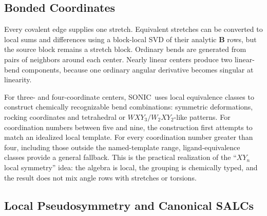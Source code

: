 \documentclass[journal=jctcce,manuscript=article,layout=traditional]{achemso}
\newcommand{\SONIC}{SONIC}
\newcommand{\Bmat}{\mathbf{B}}
\theoremstyle{definition}
\begin{document}
\subsection{Bonded Coordinates}

Every covalent edge supplies one stretch. Equivalent stretches can be converted
to local sums and differences using a block-local SVD of their analytic
\(\Bmat\) rows, but the source block remains a stretch block.  Ordinary bends
are generated from pairs of neighbors around each center.  Nearly linear
centers produce two linear-bend components, because one ordinary angular
derivative becomes singular at linearity.

For three- and four-coordinate centers, \SONIC\ uses local equivalence classes to
construct chemically recognizable bend combinations: symmetric deformations,
rocking coordinates and tetrahedral or \(WXY_3/W_2XY_2\)-like patterns.  For
coordination numbers between five and nine, the construction first attempts to
match an idealized local template.  For every coordination number greater than
four, including those outside the named-template range, ligand-equivalence
classes provide a general fallback.  This is the practical
realization of the ``\(XY_n\) local symmetry'' idea: the algebra is local, the
grouping is chemically typed, and the result does not mix angle rows with
stretches or torsions.

\subsection{Local Pseudosymmetry and Canonical SALCs}
\end{document}
